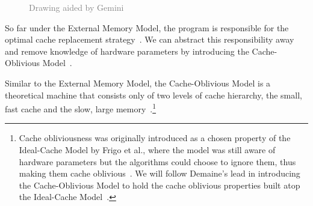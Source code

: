 \documentclass[11pt, letterpaper]{article}
\begin{document}
\begin{figure}[htbp]

    \vspace{-2pt}
    \footnotesize{\textcolor{gray}{Drawing aided by Gemini}}
    \label{fig:cache-visual}
\end{figure}

So far under the External Memory Model, the program is responsible for the optimal cache replacement strategy~\cite{demaine}. We can abstract this responsibility away and remove knowledge of hardware parameters by introducing the Cache-Oblivious Model~\cite{demaine}. 

Similar to the External Memory Model, the Cache-Oblivious Model is a theoretical machine that consists only of two levels of cache hierarchy, the small, fast cache and the slow, large memory~\cite{demaine}.\footnote{Cache obliviousness was originally introduced as a chosen property of the Ideal-Cache Model by Frigo et al., where the model was still aware of hardware parameters but the algorithms could choose to ignore them, thus making them cache oblivious~\cite{frigo}. We will follow Demaine's lead in introducing the Cache-Oblivious Model to hold the cache oblivious properties built atop the Ideal-Cache Model~\cite{demaine}.} 
\end{document}
